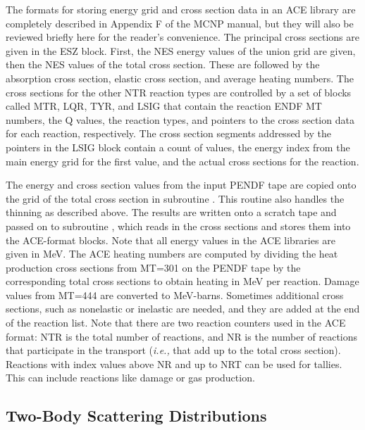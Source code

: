 The formats for storing energy grid and cross section data in an ACE
library are completely described in Appendix F of
the MCNP manual, but they will also be reviewed briefly here for the
reader's convenience.  The principal cross sections are given in the
ESZ block.  First, the NES energy values of the union grid are given,
then the NES values of the total cross section.  These are followed
by the absorption cross section, elastic cross section, and average
heating numbers.  The cross sections for the other NTR reaction types
are controlled by a set of blocks called MTR, LQR, TYR, and LSIG that
contain the reaction ENDF MT numbers, the Q values, the reaction
types, and pointers to the cross section data for each reaction,
respectively.  The cross section segments addressed by the pointers in
the LSIG block contain a count of values, the energy index from the
main energy grid for the first value, and the actual cross sections
for the reaction.

The energy and cross section values from the input PENDF tape are
copied onto the grid of the total cross section in subroutine
 .  This routine also
handles the thinning as described above.  The results are written
onto a scratch tape and passed on to subroutine
, which reads in the
cross sections and stores them into the ACE-format blocks.  Note
that all energy values in the ACE libraries are given in MeV.  The
ACE heating numbers are computed by dividing the heat production
cross sections from MT=301 on the PENDF tape by the corresponding
total cross sections to obtain heating in MeV per reaction.  Damage
values from MT=444 are converted to MeV-barns.  Sometimes additional
cross sections, such as nonelastic or inelastic are needed, and
they are added at the end of the reaction list.  Note that there
are two reaction counters used in the ACE format: NTR is the total
number of reactions, and NR is the number of reactions that
participate in the transport ({\it i.e.,} that add up to the
total cross section).  Reactions with index values above NR and
up to NRT can be used for tallies.  This can include reactions like
damage or gas production.

\subsection{Two-Body Scattering Distributions}
\label{ssACER_2body_scat}

